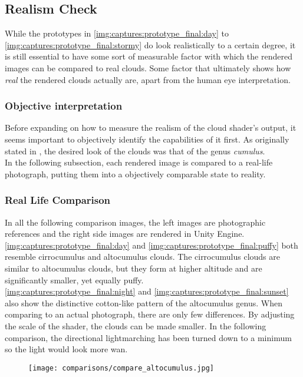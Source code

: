 \clearpage
\subsection{Realism Check}
While the prototypes in \autoref{img:captures:prototype_final:day} to \autoref{img:captures:prototype_final:stormy} do look realistically to a certain degree, it is still essential to have some sort of measurable factor with which the rendered images can be compared to real clouds.
Some factor that ultimately shows how \textit{real} the rendered clouds actually are, apart from the human eye interpretation.

\subsubsection{Objective interpretation}
Before expanding on how to measure the realism of the cloud shader's output, it seems important to objectively identify the capabilities of it first.
As originally stated in , the desired look of the clouds was that of the genus \textit{cumulus}.
\\
In the following subsection, each rendered image is compared to a real-life photograph, putting them into a objectively comparable state to reality.

\clearpage
\subsubsection{Real Life Comparison}
In all the following comparison images, the left images are photographic references and the right side images are rendered in Unity Engine.
\emptyline
\autoref{img:captures:prototype_final:day} and \autoref{img:captures:prototype_final:puffy} both resemble cirrocumulus and altocumulus clouds.
The cirrocumulus clouds are similar to altocumulus clouds, but they form at higher altitude and are significantly smaller, yet equally puffy.
\\
\autoref{img:captures:prototype_final:night} and \autoref{img:captures:prototype_final:sunset} also show the distinctive cotton-like pattern of the altocumulus genus.
When comparing to an actual photograph, there are only few differences.
\emptyline
By adjusting the scale of the shader, the clouds can be made smaller. In the following comparison, the directional \gls{lightmarching} has been turned down to a minimum so the light would look more wan. 

\begin{figure}[H]
    \centering
    \texttt{[image: comparisons/compare\_altocumulus.jpg]}
    \label{img:comparisons:altocumulus}
\end{figure}

